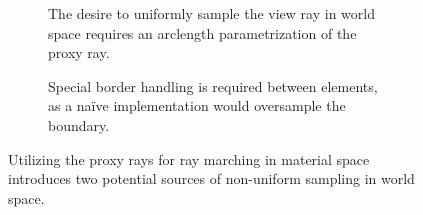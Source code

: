 \begin{figure}
\centering
\begin{subfigure}[b]{0.4\textwidth}
    \caption{The desire to uniformly sample the view ray in world space requires an arclength parametrization of the proxy ray.}
    \label{contribution:medbio:fem:arclength}
\end{subfigure}
\hspace{2cm}
\begin{subfigure}[b]{0.4\textwidth}
    \caption{Special border handling is required between elements, as a na\"{i}ve implementation would oversample the boundary.}
    \label{contribution:medbio:fem:overshoot}
\end{subfigure}
\caption{Utilizing the proxy rays for ray marching in material space introduces two potential sources of non-uniform sampling in world space.}
\end{figure}

